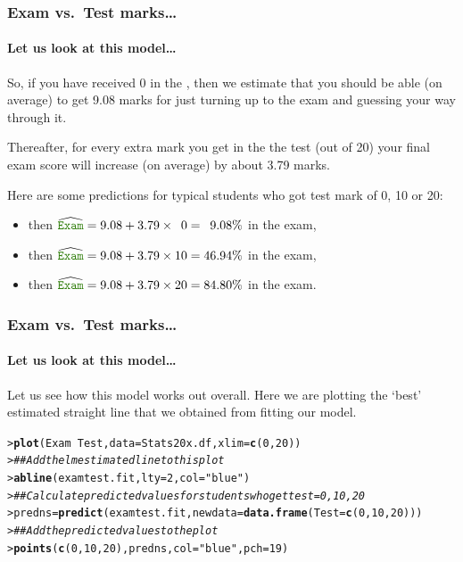 \documentclass{beamer}\usepackage[]{graphicx}\usepackage[]{xcolor}
\makeatletter
\newcommand{\hlnum}[1]{\textcolor[rgb]{0.686,0.059,0.569}{#1}}%
\newcommand{\hlstr}[1]{\textcolor[rgb]{0.192,0.494,0.8}{#1}}%
\newcommand{\hlcom}[1]{\textcolor[rgb]{0.678,0.584,0.686}{\textit{#1}}}%
\newcommand{\hlopt}[1]{\textcolor[rgb]{0,0,0}{#1}}%
\newcommand{\hlstd}[1]{\textcolor[rgb]{0.345,0.345,0.345}{#1}}%
\newcommand{\hlkwb}[1]{\textcolor[rgb]{0.69,0.353,0.396}{#1}}%
\newcommand{\hlkwc}[1]{\textcolor[rgb]{0.333,0.667,0.333}{#1}}%
\newcommand{\hlkwd}[1]{\textcolor[rgb]{0.737,0.353,0.396}{\textbf{#1}}}%
\newenvironment{kframe}{%
 \def\at@end@of@kframe{}%
 \ifinner\ifhmode%
  \def\at@end@of@kframe{\end{minipage}}%
  \begin{minipage}{\columnwidth}%
 \fi\fi%
 \def\FrameCommand##1{\hskip\@totalleftmargin \hskip-\fboxsep
 \colorbox{shadecolor}{##1}\hskip-\fboxsep
     \hskip-\linewidth \hskip-\@totalleftmargin \hskip\columnwidth}%
 \MakeFramed {\advance\hsize-\width
   \@totalleftmargin\z@ \linewidth\hsize
   \@setminipage}}%
 {\par\unskip\endMakeFramed%
 \at@end@of@kframe}
\newenvironment{knitrout}{}{} %
\makeatother
\begin{document}
\begin{frame}[fragile]
\frametitle{Exam vs.\ Test marks\ldots}
\framesubtitle{Let us look at this model\ldots}
So, if you have received $0$ in the , then we estimate that you should be able (on average) to get 9.08 marks for just turning up to the exam and guessing your way through it.

\medskip

Thereafter, for every extra mark you get in the the test (out of 20) your final exam score will increase (on average) by about 3.79 marks.

\medskip

Here are some predictions for typical students who got test mark of 0, 10 or 20:
\begin{itemize}
\item {} then $\widehat{\rcode{Exam}}=9.08+3.79\times \phantom{0}0 =\phantom{0}9.08\%$ in the exam,

\item {} then $\widehat{\rcode{Exam}}=9.08+3.79\times 10 =46.94\%$ in the exam,

\item {} then $\widehat{\rcode{Exam}}=9.08+3.79\times 20 =84.80\%$ in the exam.
\end {itemize}

\end{frame}


\begin{frame}[fragile]
\frametitle{Exam vs.\ Test marks\ldots}
\framesubtitle{Let us look at this model\ldots}
Let us see how this model works out overall.
Here we are plotting the `best' estimated straight line that we obtained from fitting our model. \\
\phantom{A space}

\begin{knitrout}\scriptsize
{}\color{fgcolor}\begin{kframe}
\begin{alltt}
\hlstd{> }\hlkwd{plot}\hlstd{(Exam} \hlopt{~} \hlstd{Test,} \hlkwc{data} \hlstd{= Stats20x.df,} \hlkwc{xlim} \hlstd{=} \hlkwd{c}\hlstd{(}\hlnum{0}\hlstd{,} \hlnum{20}\hlstd{))}
\hlstd{> }\hlcom{## Add the lm estimated line to this plot}
\hlstd{> }\hlkwd{abline}\hlstd{(examtest.fit,} \hlkwc{lty} \hlstd{=} \hlnum{2}\hlstd{,} \hlkwc{col} \hlstd{=} \hlstr{"blue"}\hlstd{)}
\hlstd{> }\hlcom{## Calculate predicted values for students who get test=0,10,20}
\hlstd{> }\hlstd{predns}\hlkwb{=}\hlkwd{predict}\hlstd{(examtest.fit,} \hlkwc{newdata} \hlstd{=} \hlkwd{data.frame}\hlstd{(}\hlkwc{Test}\hlstd{=}\hlkwd{c}\hlstd{(}\hlnum{0}\hlstd{,}\hlnum{10}\hlstd{,}\hlnum{20}\hlstd{)))}
\hlstd{> }\hlcom{## Add the predicted values to the plot}
\hlstd{> }\hlkwd{points}\hlstd{(}\hlkwd{c}\hlstd{(}\hlnum{0}\hlstd{,}\hlnum{10}\hlstd{,}\hlnum{20}\hlstd{), predns,}\hlkwc{col} \hlstd{=} \hlstr{"blue"}\hlstd{,} \hlkwc{pch} \hlstd{=} \hlnum{19}\hlstd{)}
\end{alltt}
\end{kframe}
\end{knitrout}

\end{frame}
\end{document}
